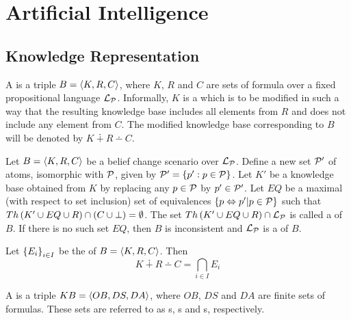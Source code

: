 \chapter{Artificial Intelligence}

\section{Knowledge Representation}

\begin{defi}
A  is a triple $B=\left\langle K,R,C\right\rangle$, where $K$, $R$ and $C$ are sets of formula over a fixed propositional language $\mathcal{L}_{\mathcal{P}}$. Informally, $K$ is a  which is to be modified in such a way that the resulting knowledge base includes all elements from $R$ and does not include any element from $C$. The modified knowledge base corresponding to $B$ will be denoted by $K\dotplus R\dotminus C$.
\cite{conf/fedcsis/KorpusikLM12}
\end{defi}

\begin{defi}
Let $B=\left\langle K,R,C\right\rangle$ be a belief change scenario over $\mathcal{L}_{\mathcal{P}}$. Define a new set $\mathcal{P}'$ of atoms, isomorphic with $\mathcal{P}$, given by $\mathcal{P}'=\left\{ p':p\in\mathcal{P}\right\}$. Let $K'$ be a knowledge base obtained from $K$ by replacing any $p\in\mathcal{P}$ by $p'\in\mathcal{P}'$. Let $EQ$ be a maximal (with respect to set inclusion) set of equivalences $\left\{ p\Leftrightarrow p'|p\in\mathcal{P}\right\}$ such that $Th\left(K'\cup EQ\cup R\right)\cap\left( C\cup\bot\right)=\emptyset$. The set $Th\left(K'\cup EQ\cup R\right)\cap\mathcal{L}_{\mathcal{P}}$ is called a  of $B$. If there is no such set $EQ$, then $B$ is inconsistent and $\mathcal{L}_{\mathcal{P}}$ is a  of $B$.
\cite{conf/fedcsis/KorpusikLM12}
\end{defi}

\begin{defi}
Let $\left\{ E_i\right\}_{i\in I}$ be the  of $B=\left\langle K,R,C\right\rangle$. Then
\begin{equation}
K\dotplus R\dotminus C=\displaystyle\bigcap_{i\in I}E_i
\end{equation}
\cite{conf/fedcsis/KorpusikLM12}
\end{defi}

\begin{defi}
A  is a triple $KB=\left\langle OB,DS,DA\right\rangle$, where $OB$, $DS$ and $DA$ are finite sets of formulas. These sets are referred to as s, s and s, respectively.
\cite{conf/fedcsis/KorpusikLM12}
\end{defi}

